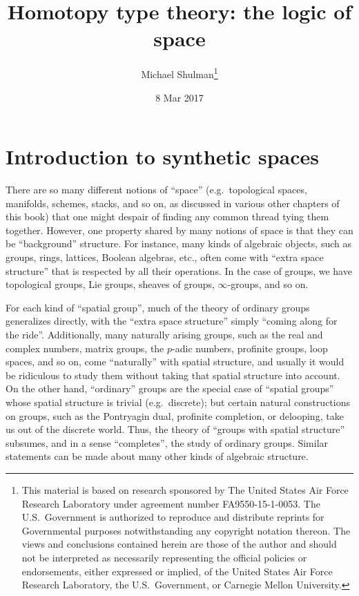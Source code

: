 \documentclass[12pt]{article}
\title{Homotopy type theory: the logic of space}
\date{8 Mar 2017}
\author{Michael Shulman\thanks{This material is based on research sponsored by The United States Air Force Research Laboratory under agreement number FA9550-15-1-0053.  The U.S.~Government is authorized to reproduce and distribute reprints for Governmental purposes notwithstanding any copyright notation thereon.  The views and conclusions contained herein are those of the author and should not be interpreted as necessarily representing the official policies or endorsements, either expressed or implied, of the United States Air Force Research Laboratory, the U.S.~Government, or Carnegie Mellon University.}}
\def\oo{\ensuremath{\infty}}
\numberwithin{equation}{section}
\begin{document}
\maketitle

\section{Introduction to synthetic spaces}
\label{sec:introduction}

There are so many different notions of ``space'' (e.g.\ topological spaces, manifolds, schemes, stacks, and so on, as discussed in various other chapters of this book) that one might despair of finding any common thread tying them together.
However, one property shared by many notions of space is that they can be ``background'' structure.
For instance, many kinds of algebraic objects, such as groups, rings, lattices, Boolean algebras, etc., often come with ``extra space structure'' that is respected by all their operations.
In the case of groups, we have topological groups, Lie groups, sheaves of groups, \oo-groups, and so on.

For each kind of ``spatial group'', much of the theory of ordinary groups generalizes directly, with the ``extra space structure'' simply ``coming along for the ride''.
Additionally, many naturally arising groups, such as the real and complex numbers, matrix groups, the $p$-adic numbers, profinite groups, loop spaces, and so on, come ``naturally'' with spatial structure, and usually it would be ridiculous to study them without taking that spatial structure into account.
On the other hand, ``ordinary'' groups are the special case of ``spatial groups'' whose spatial structure is trivial (e.g.\ discrete); but certain natural constructions on groups, such as the Pontryagin dual, profinite completion, or delooping, take us out of the discrete world.
Thus, the theory of ``groups with spatial structure'' subsumes, and in a sense ``completes'', the study of ordinary groups.
Similar statements can be made about many other kinds of algebraic structure.
\end{document}
